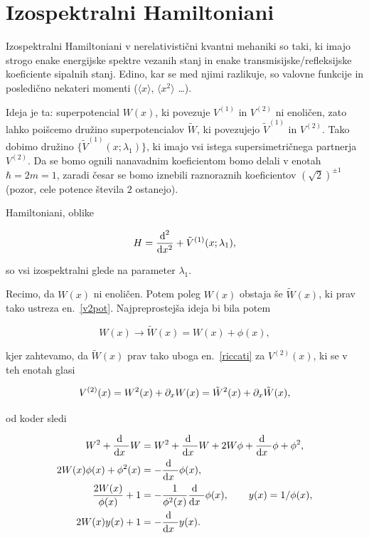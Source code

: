 \section{Izospektralni Hamiltoniani}

Izospektralni Hamiltoniani v nerelativisti\v cni kvantni mehaniki so taki, ki imajo strogo enake energijske
spektre vezanih stanj in enake transmisijske/refleksijske koeficiente sipalnih stanj. Edino, kar se
med njimi razlikuje, so valovne funkcije in posledi\v cno nekateri momenti ($\langle x \rangle$, $\langle
x^2 \rangle$ \ldots).

Ideja je ta: superpotencial $W(x)$, ki povezuje $V^{(1)}$ in $V^{(2)}$ ni enoli\v cen, zato lahko poi\v scemo
dru\v zino superpotencialov $\tilde{W}$, ki povezujejo $\tilde{V}^{(1)}$ in $V^{(2)}$. Tako dobimo dru\v zino
$\{\tilde{V}^{(1)}(x;\lambda_1)\}$, ki imajo vsi istega supersimetri\v cnega partnerja $V^{(2)}$. Da se bomo ognili
nanavadnim koeficientom bomo delali v enotah $\hbar = 2m = 1$, zaradi \v cesar se bomo iznebili raznoraznih
koeficientov $(\sqrt{2})^{\pm 1}$ (pozor, cele potence \v stevila $2$ ostanejo).

Hamiltoniani, oblike

\begin{equation}
	H = \frac{\text{d}^2}{\text{d} x^2} + \tilde{V}^{(1)} (x;\lambda_1),
\end{equation}

\ni so vsi izospektralni glede na parameter $\lambda_1$.

Recimo, da $W(x)$ ni enoli\v cen. Potem poleg $W(x)$ obstaja \v se $\tilde{W}(x)$, ki prav tako ustreza
en.~\eqref{v2pot}. Najpreprostej\v sa ideja bi bila potem

\begin{equation}
	W(x) \to \tilde{W}(x) = W(x) + \phi(x),
\end{equation}

\ni kjer zahtevamo, da $\tilde{W}(x)$ prav tako uboga en.~\eqref{riccati} za $V^{(2)}(x)$, ki se v teh enotah
glasi

\begin{equation}
	V^{(2)} (x) = W^2(x) + \partial_x W(x) = \tilde{W}^2(x) + \partial_x\tilde{W}(x),
\end{equation}

\ni od koder sledi

\begin{align}
	W^2 + \frac{\text{d}^{}\ }{\text{d} x^{}\ } W &= W^2 + \frac{\text{d}^{}\ }{\text{d} x^{}\ } W + 2W\phi + \frac{\text{d}^{}\ }{\text{d} x^{}\ } \phi + \phi^2, \notag \\
	2W(x)\phi(x) + \phi^2(x) &= -\frac{\text{d}^{}\ }{\text{d} x^{}\ } \phi (x), \notag \\
	\frac{2W(x)}{\phi(x)} + 1 &= -\frac{1}{\phi^2(x)}\frac{\text{d}^{}\ }{\text{d} x^{}\ }\phi(x),\qquad y(x) = 1/\phi(x), \notag \\
	2W(x)y(x) + 1 &= -\frac{\text{d}^{}\ }{\text{d} x^{}\ } y(x).
\end{align}

